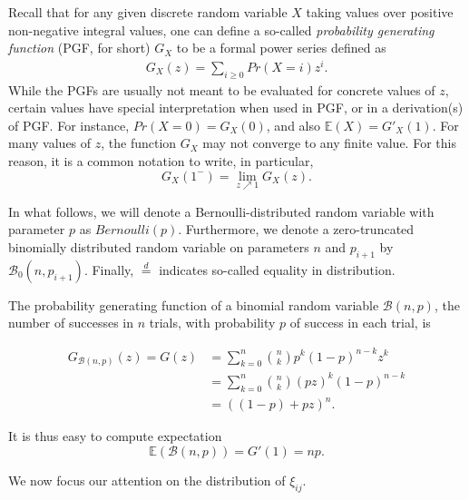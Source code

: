 \documentclass[algorithms,article,accept,pdftex,moreauthors]{Definitions/mdpi}
\begin{document}
Recall that for any given discrete random variable $X$ taking values over positive non-negative integral values, one can define 
a so-called \emph{probability generating function} (PGF, for short) $G_X$ to be a formal power series defined as 
\begin{align*}
G_X(z)=\sum_{i\ge 0} Pr(X=i)z^i.
\end{align*}
While the PGFs are usually not meant to be evaluated for concrete values of $z$, certain values have special interpretation when used in PGF, or in a derivation(s) of PGF. 
For instance, $Pr(X=0)=G_X(0)$, and also $\mathbb{E}(X)=G'_X(1)$.
For many values of $z$, the function $G_X$ may not converge to any finite value. For this reason, it is a common notation to write, in particular,
\[
G_X(1^-)=\lim_{z\nearrow 1}G_X(z).
\]

In what follows, we will denote a Bernoulli-distributed random variable with parameter $p$ as $Bernoulli(p)$.
Furthermore, we denote
a zero-truncated binomially
distributed random variable on parameters $n$ and $p_{i+1}$ by $\mathcal{B}_0(n,p_{i+1})$. Finally, $\overset{d}{=}$ indicates so-called equality in distribution.

\begin{Example}
The probability generating function of a binomial random variable $\mathcal B(n,p)$, the number of successes in $n$ trials, with probability $p$ of success in each trial, is

\begin{align*}
 G_{\mathcal B(n,p)}(z)=G(z)
 &=\sum_{k = 0}^n \binom n k p^k  (1 - p)^{n - k} z^k\\
 &= \sum_{k = 0}^n \binom n k  (p z)^k  (1 - p)^{n - k}\\
 &=\left((1-p)+pz\right)^{n}.
\end{align*}

It is thus easy to compute expectation
\[
\mathbb{E}(\mathcal{B}(n,p))=G'(1)=np.
\]

\end{Example}

We now focus our attention on the distribution of $\xi_{ij}$.
\end{document}
